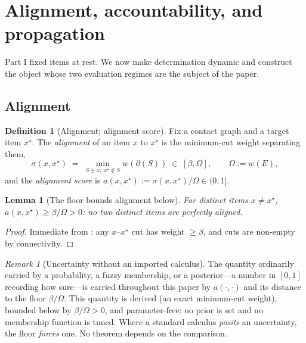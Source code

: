\documentclass[11pt,twocolumn,a4paper]{article}
\theoremstyle{dirthm}
\newtheorem{lemma}[theorem]{Lemma}
\theoremstyle{definition}
\newtheorem{definition}[theorem]{Definition}
\theoremstyle{remark}
\newtheorem{remark}[theorem]{Remark}
\newcommand{\E}{E}
\newcommand{\wt}{w}
\newcommand{\flo}{\beta}
\newcommand{\cut}{\partial}
\newcommand{\str}{\sigma}
\newcommand{\al}{a}
\newcommand{\Om}{\Omega}
\begin{document}
\section{Alignment, accountability, and propagation}
\label{sec:table}

Part I fixed items at rest. We now make determination dynamic and construct
the object whose two evaluation regimes are the subject of the paper.

\subsection{Alignment}

\begin{definition}[Alignment; alignment score]
\label{def:alignment}
Fix a contact graph and a target item $x^{\star}$. The \emph{alignment} of an
item $x$ to $x^{\star}$ is the minimum-cut weight separating them,
\[
\str(x,x^{\star})\;=\;\min_{S\ni x,\ x^{\star}\notin S}\wt(\cut(S))\;\in\;[\flo,\Om],
\qquad \Om:=\wt(\E),
\]
and the \emph{alignment score} is $\al(x,x^{\star}):=\str(x,x^{\star})/\Om\in(0,1]$.
\end{definition}

\begin{lemma}[The floor bounds alignment below]
\label{lem:align-floor}
For distinct items $x\neq x^{\star}$, $\al(x,x^{\star})\ge\flo/\Om>0$: no two
distinct items are perfectly aligned.
\end{lemma}

\begin{proof}
Immediate from : any $x$--$x^{\star}$ cut has weight $\ge\flo$,
and cuts are non-empty by connectivity.
\end{proof}

\begin{remark}[Uncertainty without an imported calculus]
\label{rem:no-prior}
The quantity ordinarily carried by a probability, a fuzzy membership, or a
posterior---a number in $[0,1]$ recording how sure---is carried throughout
this paper by $\al(\cdot,\cdot)$ and its distance to the floor $\flo/\Om$.
This quantity is derived (an exact minimum-cut weight), bounded below by
$\flo/\Om>0$, and parameter-free: no prior is set and no membership function
is tuned. Where a standard calculus \emph{posits} an uncertainty, the floor
\emph{forces} one. No theorem depends on the comparison.
\end{remark}
\end{document}

